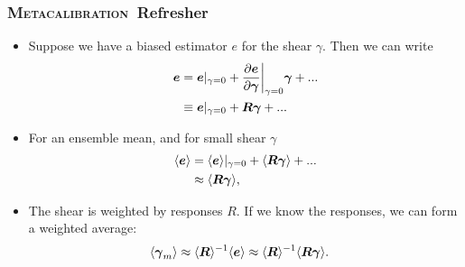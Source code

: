 \documentclass{beamer}
\newcommand{\Mcal}{\textsc{Metacalibration}}
\newcommand{\mcalR}{\mbox{\boldmath $R$}}
\newcommand{\vecg}{\mbox{\boldmath $\gamma$}}
\newcommand{\vest}{\mbox{\boldmath $e$}}
\begin{document}
\frame
{
    \frametitle{\Mcal\ Refresher}

 
    \begin{itemize}

        \item Suppose we have a biased estimator {\color{gold} \vest} for the shear {\color{gold} \vecg}.  Then we can write
            {\color{gold}
\begin{align} \label{eq:Eexpand}
    \vest &= \vest|_{\gamma=0} + \frac{ \partial \vest }{ \partial \vecg}\bigg|_{\gamma=0} \vecg  + ... \nonumber \\
          &\equiv \vest|_{\gamma=0} + \mbox{\mcalR}\vecg  + ...
\end{align}
            } 

        \item For an ensemble mean, and for small shear {\color{gold} \vecg}
            {\color{gold}
                \begin{align}
                    \langle \vest \rangle &= \langle \vest \rangle |_{\gamma=0} + \langle \mbox{\mcalR} \vecg \rangle + ... \nonumber \\
                                          &\approx \langle \mbox{\mcalR} \vecg \rangle,
                \end{align}
                }

            \item The shear is weighted by responses {\color{cadetblue} \mcalR}.  If we know the
                responses, we can form a weighted average:
            {\color{gold}
\begin{align} \label{eq:rcorr}
    \langle \vecg_m \rangle &\approx \langle \mbox{\mcalR} \rangle^{-1}  \langle \vest \rangle \approx \langle \mbox{\mcalR} \rangle^{-1} \langle \mcalR \vecg \rangle.
\end{align}
            }
    \end{itemize}
}
\end{document}
